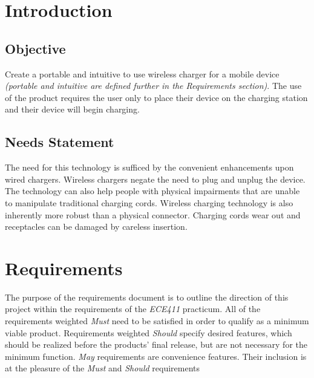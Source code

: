 


\section{Introduction}

    \subsection{Objective}
    
     Create a portable and intuitive to use wireless charger for a mobile device \textit{(portable and intuitive are defined further in the Requirements section)}. The use of the product requires the user only to place their device on the charging station and their device will begin charging.
    
    \subsection{Needs Statement}
     The need for this technology is sufficed by the convenient enhancements upon wired chargers. Wireless chargers negate the need to plug and unplug the device. The technology can also help people with physical impairments that are unable to manipulate traditional charging cords.
     Wireless charging technology is also inherently more robust than a physical connector. Charging cords wear out and receptacles can be damaged by careless insertion.


\section{Requirements}

The purpose of the requirements document is to outline the direction of this project within the requirements of the \textit{ECE411} practicum. All of the requirements weighted \textit{Must} need to be satisfied in order to qualify as a minimum viable product. Requirements weighted \textit{Should} specify desired features, which should be realized before the products' final release, but are not necessary for the minimum function. \textit{May} requirements are convenience features. Their inclusion is at the pleasure of the \textit{Must} and \textit{Should} requirements

